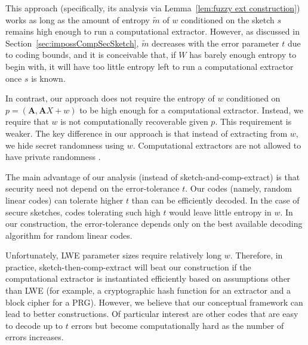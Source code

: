 \documentclass[11pt]{article}
\newcommand{\secref}[1]{\mbox{Section~\ref{#1}}}
\newcommand{\lemref}[1]{\mbox{Lemma~\ref{#1}}}
\newcommand{\consref}[1]{\mbox{Construction~\ref{#1}}}
\newcommand{\vect}[1]{\ensuremath{\textbf{#1}}}
\newcommand{\vA}{\vect{A}}
\begin{document}
This approach (specifically, its analysis via \lemref{lem:fuzzy ext construction}) works as long as the amount of entropy $\tilde{m}$ of $w$ conditioned on the sketch $s$ remains high enough to run a computational extractor.  However, as discussed in \secref{sec:impossCompSecSketch}, $\tilde{m}$ decreases with the error parameter $t$ due to coding bounds, and it is conceivable that, if $W$ has  barely enough entropy to begin with, it will have too little entropy left to run a computational extractor once $s$ is known.

In contrast, our approach does not require the entropy of $w$ conditioned on $p=(\vA, \vA X+w)$ to  be high enough for a computational extractor. Instead, we require that $w$ is not computationally recoverable  given $p$.  This requirement is weaker.  The key difference in our approach is that instead of extracting from $w$, we hide secret randomness using $w$. Computational extractors are not allowed to have private randomness \cite[Definition 3]{krawczyk2010cryptographic}.

The main advantage of our analysis (instead of sketch-and-comp-extract) is that security need not depend on the error-tolerance $t$.  Our codes (namely, random linear codes) can tolerate higher $t$ than can be efficiently decoded.  In the case of secure sketches, codes tolerating such high $t$ would leave little entropy in $w$.  In our construction, the error-tolerance depends only on the best available decoding algorithm for random linear codes.  

Unfortunately, LWE parameter sizes require relatively long $w$. Therefore, in practice, sketch-then-comp-extract will beat our construction  if the computational extractor is instantiated efficiently based on assumptions other than LWE (for example, a cryptographic hash function for an extractor and a block cipher for a PRG). However, we believe that our conceptual framework can lead to better constructions.  Of particular interest are  other codes that are easy to decode up to $t$ errors but become computationally hard as the number of errors increases.

\end{document}
